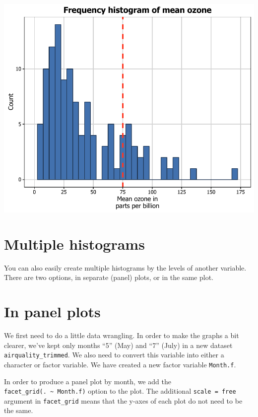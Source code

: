 \begin{center}\includegraphics[width=0.6\linewidth]{7_Histograms_pdf/histogram_18-1} \end{center}

\section{Multiple histograms}\label{multiple-histograms}

You can also easily create multiple histograms by the levels of another
variable. There are two options, in separate (panel) plots, or in the
same plot.

\section{In panel plots}\label{in-panel-plots}

We first need to do a little data wrangling. In order to make the graphs
a bit clearer, we've kept only months ``5'' (May) and ``7'' (July) in a
new dataset \texttt{airquality\_trimmed}. We also need to convert this
variable into either a character or factor variable. We have created a
new factor variable \texttt{Month.f}.

In order to produce a panel plot by month, we add the
\texttt{facet\_grid(.\ \textasciitilde{}\ Month.f)} option to the plot.
The additional \texttt{scale\ =\ free} argument in \texttt{facet\_grid}
means that the y-axes of each plot do not need to be the same.

